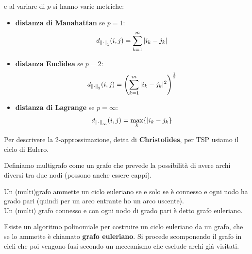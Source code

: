 															e al variare di $p$ si hanno varie metriche:
															\begin{itemize}
																\item \textbf{distanza di Manahattan} se $p=1$:
																      \[d_{\norm{\cdot}_1}(i,j)=\sum_{k=1}^m|i_k-j_k|\]
																\item \textbf{distanza Euclidea} se $p=2$:
																      \[d_{\norm{\cdot}_2}(i,j)=\left(\sum_{k=1}^m
																      	|i_k-j_k|^2\right)^{\frac{1}{2}}\]
																      	\item \textbf{distanza di Lagrange} se $p=\infty$:
																      	\[d_{\norm{\cdot}_\infty}(i,j)=\max_k\{|i_k-j_k\}\]
																      	\end{itemize}
																      	Per descrivere la 2-approssimazione, detta di \textbf{Christofides}, per TSP
																      	usiamo il ciclo di Eulero.
																      	\begin{definizione}
																      		Definiamo multigrafo come un grafo che prevede la possibilità di avere archi
																      		diversi tra due nodi (possono anche essere cappi).
																      	\end{definizione}
																      	\begin{definizione}[definizione di Eulero]
																      		Un (multi)grafo ammette un ciclo euleriano se e solo se è connesso e ogni nodo
																      		ha grado pari (quindi per un arco entrante ho un arco uscente).\\
																      		Un (multi) grafo connesso e con ogni nodo di grado pari è detto grafo
																      		euleriano. 
																      	\end{definizione}
																      	Esiste un algoritmo polinomiale per costruire un ciclo euleriano da un grafo,
																      	che se lo ammette è chiamato \textbf{grafo euleriano}. Si procede scomponendo il
																      	grafo in cicli che poi vengono fusi secondo un meccanismo che esclude archi già
																      	visitati.\\
																      																	      	
